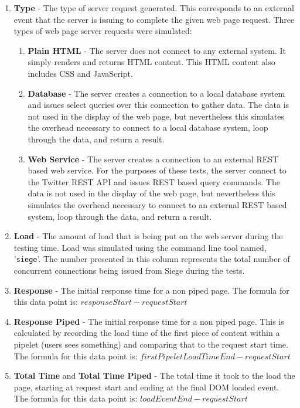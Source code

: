 \documentclass[12pt]{report}
\begin{document}
\begin{enumerate}
\item \textbf{Type} - The type of server request generated. This corresponds to an external event that the server is issuing to complete the given web page request. Three types of web page server requests were simulated:
	\begin{enumerate}
	\item \textbf{Plain HTML} - The server does not connect to any external system. It simply renders and returns HTML content. This HTML content also includes CSS and JavaScript.
	\item \textbf{Database} - The server creates a connection to a local database system and issues select queries over this connection to gather data. The data is not used in the display of the web page, but nevertheless this simulates the overhead necessary to connect to a local database system, loop through the data, and return a result.
	\item \textbf{Web Service} - The server creates a connection to an external REST based web service. For the purposes of these tests, the server connect to the Twitter REST API and issues REST based query commands. The data is not used in the display of the web page, but nevertheless this simulates the overhead necessary to connect to an external REST based system, loop through the data, and return a result.
	\end{enumerate}
\item \textbf{Load} - The amount of load that is being put on the web server during the testing time. Load was simulated using the command line tool named, '\texttt{siege}'. The number presented in this column represents the total number of concurrent connections being issued from Siege during the tests.
\item \textbf{Response} - The initial response time for a non piped page. The formula for this data point is: \begin{math} responseStart - requestStart \end{math} 
\item \textbf{Response Piped} - The initial response time for a non piped page. This is calculated by recording the load time of the first piece of content within a pipelet (users sees something) and comparing that to the request start time. The formula for this data point is: \begin{math} firstPipeletLoadTimeEnd - requestStart \end{math} 
\item \textbf{Total Time} and \textbf{Total Time Piped}   - The total time it took to the load the page, starting at request start and ending at the final DOM loaded event. The formula for this data point is: \begin{math} loadEventEnd - requestStart \end{math} 
\end{enumerate}
\end{document}

